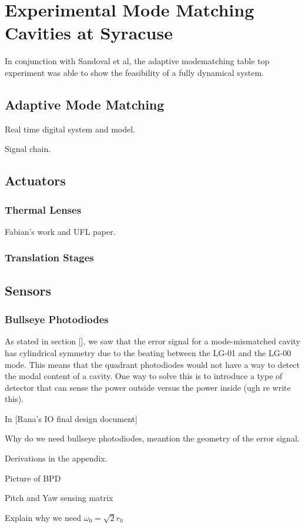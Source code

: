 \documentclass[oneside]{book}
\begin{document}
\chapter{Experimental Mode Matching Cavities at Syracuse}
In conjunction with Sandoval et al, the adaptive modematching table top experiment was able to show the feasibility of a fully dynamical system.
	\section{Adaptive Mode Matching}
	Real time digital system and model.
	
	Signal chain.
	
	\section{Actuators}
		\subsection{Thermal Lenses}
		Fabian's work and UFL paper.
		\subsection{Translation Stages}
		
	\section{Sensors}
		\subsection{Bullseye Photodiodes}
		As stated in section [], we saw that the error signal for a mode-mismatched cavity has cylindrical symmetry due to the beating between the LG-01 and the LG-00 mode.  This means that the quadrant photodiodes would not have a way to detect the modal content of a cavity.  One way to solve this is to introduce a type of detector that can sense the power outside versus the power inside (ugh re write this).
		
		In [Rana's IO final design document] 
		
		
		Why do we need bullseye photodiodes, meantion the geometry of the error signal.
		
		Derivations in the appendix.
		
		Picture of BPD
		
		Pitch and Yaw sensing matrix
		
		Explain why we need $\omega_{0} = \sqrt{2} r_0$
		
\end{document}
